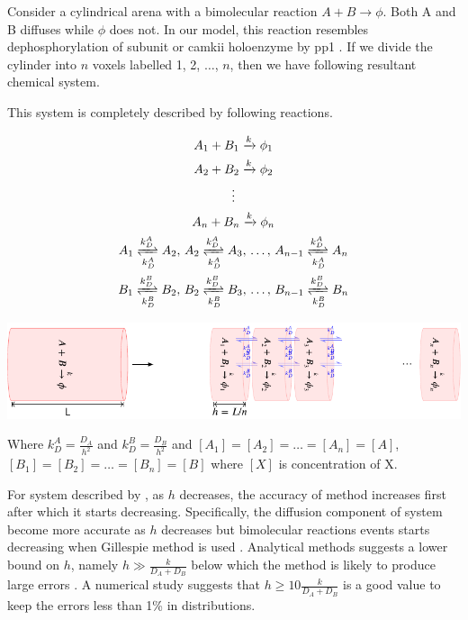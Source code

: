 \documentclass[9pt,lineno]{elife}
\begin{document}
{\begin{appendixbox}
Consider a cylindrical arena with a bimolecular reaction $A+B \rightarrow \phi$.
Both A and B diffuses while $\phi$ does not. In our model, this reaction
resembles dephosphorylation of subunit or \gls{camkii} holoenzyme by \gls{pp1} .
If we divide the cylinder into $n$ voxels labelled 1, 2, $\ldots$, $n$, then we
have following resultant chemical system.

This system is completely described by following reactions.

\begin{equation}
    \begin{gathered}
        A_1 + B_1 \xrightarrow{k} \phi_1 \\
        A_2 + B_2 \xrightarrow{k} \phi_2 \\
        \vdots \\
        A_n + B_n \xrightarrow{k} \phi_n \\
        A_1 \xrightleftharpoons[k_D^A]{k_D^A} A_2 ,\, A_2 \xrightleftharpoons[k_D^A]{k_D^A} A_3 
            ,\, \ldots,\, A_{n-1} \xrightleftharpoons[k_D^A]{k_D^A} A_n \\ 
        B_1 \xrightleftharpoons[k_D^B]{k_D^B} B_2 ,\, 
            B_2 \xrightleftharpoons[k_D^B]{k_D^B} B_3 ,\, 
            \ldots,\, B_{n-1} \xrightleftharpoons[k_D^B]{k_D^B} B_n \\ 
    \end{gathered}
    \label{eq:discrete}
\end{equation}

\begin{center}
\includegraphics[width=0.8\linewidth]{./PaperFigures/suppl/figure_diff.pdf}
\end{center}

Where $k_D^A=\frac{D_A}{h^2}$ and $k_D^B=\frac{D_B}{h^2}$ and
$[A_1]=[A_2]=\ldots=[A_n]=[A]$, $[B_1]=[B_2]=\ldots=[B_n]=[B]$ where $[X]$ is
concentration of X.

For system described by , as $h$ decreases, the accuracy of
method increases first after which it starts decreasing. Specifically, the
diffusion component of system become more accurate as $h$ decreases but
bimolecular reactions events starts decreasing when Gillespie method is used
\citep{gardiner_correlations_1976}. Analytical methods  suggests a lower bound on
$h$, namely $h\gg \frac{k}{D_A+D_B}$ below which the method is likely to
produce large errors \citep{isaacson_reaction-diffusion_2009}. A numerical
study \citep{erban_stochastic_2009} suggests that $h\ge 10\frac{k}{D_A+D_B}$ is
a good value to keep the errors less than 1\% in distributions.


\end{appendixbox}}
\end{document}
